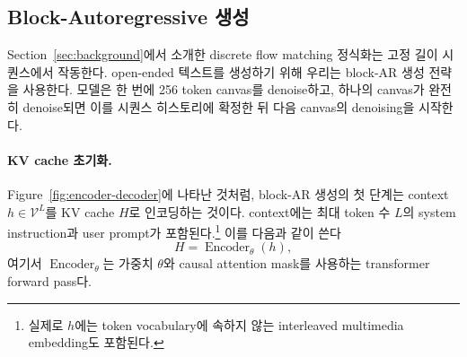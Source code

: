 \documentclass[11pt, a4paper, logo, copyright, gdm]{google}
\newcommand{\enc}{\operatorname{Encoder}_{\theta}}
\newcommand{\Vcal}{\mathcal{V}}
\begin{document}
\subsection{Block-Autoregressive 생성}\label{sec:block-ar}

Section~\ref{sec:background}에서 소개한 discrete flow matching 정식화는 고정 길이 시퀀스에서 작동한다. open-ended 텍스트를 생성하기 위해 우리는 block-AR 생성 전략을 사용한다. 모델은 한 번에 256 token canvas를 denoise하고, 하나의 canvas가 완전히 denoise되면 이를 시퀀스 히스토리에 확정한 뒤 다음 canvas의 denoising을 시작한다.

\paragraph{KV cache 초기화.} Figure~\ref{fig:encoder-decoder}에 나타난 것처럼, block-AR 생성의 첫 단계는 context $h \in \Vcal^L$를 KV cache $H$로 인코딩하는 것이다. context에는 최대 token 수 $L$의 system instruction과 user prompt가 포함된다.\footnote{실제로 $h$에는 token vocabulary에 속하지 않는 interleaved multimedia embedding도 포함된다.} 이를 다음과 같이 쓴다
\begin{equation}
    \label{eq:encoder}
    H = \enc(h),
\end{equation}
여기서 $\enc$는 가중치 $\theta$와 causal attention mask를 사용하는 transformer forward pass다.
\end{document}
